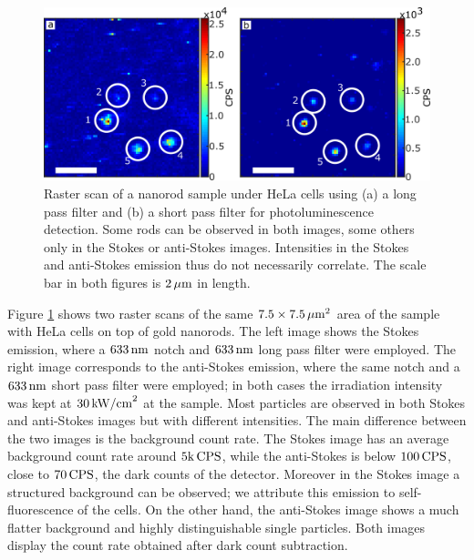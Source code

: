 \begin{figure}[tp] \centering
\includegraphics[width=12cm]{Chapters/03_Background_Free/Figures/04_Stokes_AS/stokes_as_no_dye.png}
\caption{Raster scan of a nanorod sample under HeLa cells using (a) a long pass
filter and (b) a short pass filter for photoluminescence detection.
Some rods can be observed in both images, some others only in the Stokes or
anti-Stokes images. Intensities in the Stokes and anti-Stokes emission thus do
not necessarily correlate. The scale bar in both figures is $2\,\mu\textrm{m}$ in length.}
	\label{fig:stokes_as_no_dye}
\end{figure}

Figure \ref{fig:stokes_as_no_dye} shows two raster scans of the same
$7.5\times7.5\,\mu\textrm{m}^2$ area of the sample with HeLa cells on top of gold nanorods.
The left image shows the Stokes emission, where a $633\,\textrm{nm}$ notch and $633\,\textrm{nm}$
long pass filter were employed. The right image corresponds to the anti-Stokes
emission, where the same notch and a $633\,\textrm{nm}$ short pass filter were employed;
in both cases the irradiation intensity was kept at $30\,\textrm{kW/cm}^2$ at the
sample. Most particles are observed in both Stokes and anti-Stokes images but
with different intensities. The main difference between the two images is the
background count rate. The Stokes image has an average background count
rate around $5\textrm{k}\,\textrm{CPS}$, while the anti-Stokes is below $100\,\textrm{CPS}$,
close to $70\,\textrm{CPS}$, the dark counts of the detector. Moreover in the
Stokes image a structured background can be observed; we attribute this emission
to self-fluorescence of the cells. On the other hand, the anti-Stokes image
shows a much flatter background and highly distinguishable single particles.
Both images display the count rate obtained after dark count subtraction.

